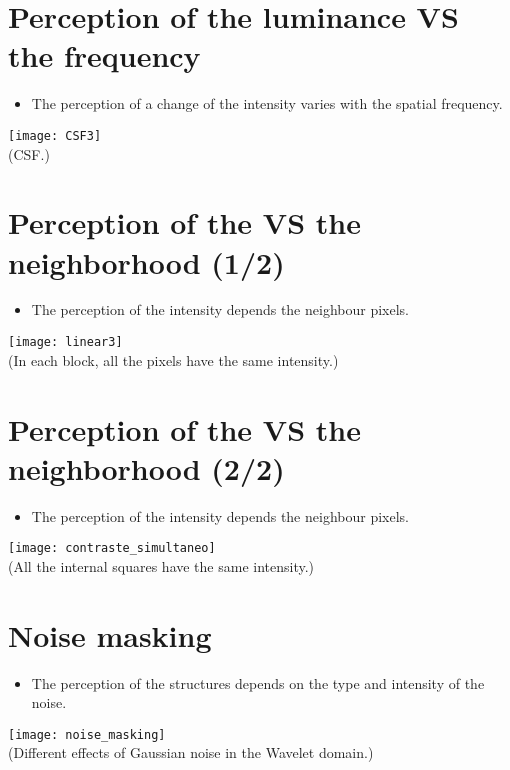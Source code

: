 \section{Perception of the luminance VS the frequency}
\begin{itemize}
\item The perception of a change of the intensity varies with the spatial frequency.
\end{itemize}
\begin{center}
  \texttt{[image: CSF3]}\\
  (\gls{CSF}.)
\end{center}

\section{Perception of the  VS the neighborhood (1/2)}
\begin{itemize}
\item The perception of the intensity depends the neighbour pixels.
\end{itemize}
\begin{center}
  \texttt{[image: linear3]}\\
  (In each block, all the pixels have the same intensity.)
\end{center}

\section{Perception of the  VS the neighborhood (2/2)}
\begin{itemize}
\item The perception of the intensity depends the neighbour pixels.
\end{itemize}
\begin{center}
  \texttt{[image: contraste\_simultaneo]}\\
  (All the internal squares have the same intensity.)
\end{center}

\section{Noise masking}
\begin{itemize}
\item The perception of the structures depends on the type and intensity of the noise.
\end{itemize}
\begin{center}
  \texttt{[image: noise\_masking]}\\
  (Different effects of Gaussian noise in the Wavelet domain.)
\end{center}
